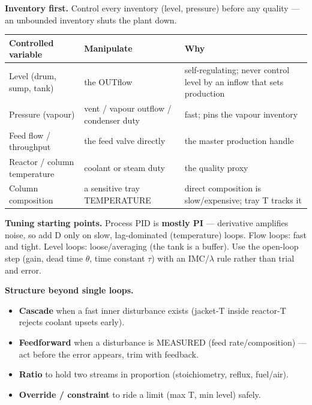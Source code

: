\documentclass[11pt,a4paper]{article}
\providecommand{\tightlist}{\setlength{\itemsep}{0pt}\setlength{\parskip}{0pt}}
\begin{document}
\textbf{Inventory first.} Control every inventory (level, pressure)
before any quality --- an unbounded inventory shuts the plant down.

\begin{longtable}[]{@{}>{\raggedright\arraybackslash}p{\dimexpr(\linewidth-6\tabcolsep)/3\relax}>{\raggedright\arraybackslash}p{\dimexpr(\linewidth-6\tabcolsep)/3\relax}>{\raggedright\arraybackslash}p{\dimexpr(\linewidth-6\tabcolsep)/3\relax}@{}}
\toprule\noalign{}
Controlled variable & Manipulate & Why \\
\midrule\noalign{}
\endhead
\bottomrule\noalign{}
\endlastfoot
Level (drum, sump, tank) & the OUTflow & self-regulating; never control
level by an inflow that sets production \\
Pressure (vapour) & vent / vapour outflow / condenser duty & fast; pins
the vapour inventory \\
Feed flow / throughput & the feed valve directly & the master production
handle \\
Reactor / column temperature & coolant or steam duty & the quality
proxy \\
Column composition & a sensitive tray TEMPERATURE & direct composition
is slow/expensive; tray T tracks it \\
\end{longtable}

\textbf{Tuning starting points.} Process PID is \textbf{mostly PI} ---
derivative amplifies noise, so add D only on slow, lag-dominated
(temperature) loops. Flow loops: fast and tight. Level loops:
loose/averaging (the tank is a buffer). Use the open-loop step (gain,
dead time \(\theta\), time constant \(\tau\)) with an IMC/\(\lambda\) rule rather than trial and
error.

\textbf{Structure beyond single loops.}

\begin{itemize}
\tightlist
\item
  \textbf{Cascade} when a fast inner disturbance exists (jacket-T inside
  reactor-T rejects coolant upsets early).
\item
  \textbf{Feedforward} when a disturbance is MEASURED (feed
  rate/composition) --- act before the error appears, trim with
  feedback.
\item
  \textbf{Ratio} to hold two streams in proportion (stoichiometry,
  reflux, fuel/air).
\item
  \textbf{Override / constraint} to ride a limit (max T, min level)
  safely.
\end{itemize}
\end{document}
